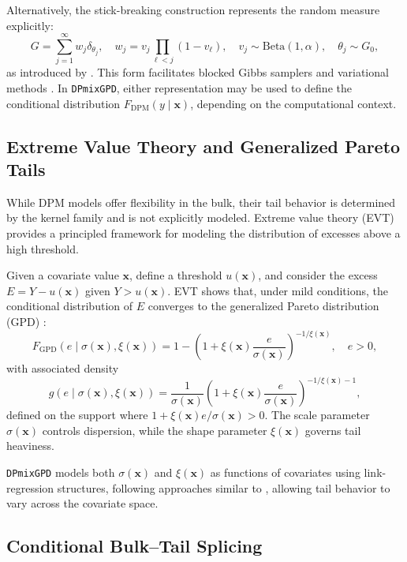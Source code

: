 \documentclass[article]{jss}\usepackage[]{graphicx}\usepackage[]{xcolor}
\begin{document}
Alternatively, the stick-breaking construction represents the random measure explicitly:
\[
G = \sum_{j=1}^\infty w_j \delta_{\theta_j}, \quad
w_j = v_j \prod_{\ell < j} (1 - v_\ell), \quad
v_j \sim \text{Beta}(1, \alpha), \quad
\theta_j \sim G_0,
\]
as introduced by \citet{sethuraman1994constructive}. This form facilitates blocked Gibbs samplers and variational methods \citep{ishwaran2001gibbs}. In \texttt{DPmixGPD}, either representation may be used to define the conditional distribution $F_{\text{DPM}}(y \mid \mathbf{x})$, depending on the computational context.

\subsection{Extreme Value Theory and Generalized Pareto Tails}

While DPM models offer flexibility in the bulk, their tail behavior is determined by the kernel family and is not explicitly modeled. Extreme value theory (EVT) provides a principled framework for modeling the distribution of excesses above a high threshold.

Given a covariate value $\mathbf{x}$, define a threshold $u(\mathbf{x})$, and consider the excess $E = Y - u(\mathbf{x})$ given $Y > u(\mathbf{x})$. EVT shows that, under mild conditions, the conditional distribution of $E$ converges to the generalized Pareto distribution (GPD) \citep{pickands1975statistical,embrechts1997modelling}:
\[
F_{\text{GPD}}(e \mid \sigma(\mathbf{x}), \xi(\mathbf{x})) = 1 - \left(1 + \xi(\mathbf{x}) \frac{e}{\sigma(\mathbf{x})}\right)^{-1/\xi(\mathbf{x})}, \quad e > 0,
\]
with associated density
\[
g(e \mid \sigma(\mathbf{x}), \xi(\mathbf{x})) =
\frac{1}{\sigma(\mathbf{x})}
\left(1 + \xi(\mathbf{x}) \frac{e}{\sigma(\mathbf{x})}\right)^{-1/\xi(\mathbf{x}) - 1},
\]
defined on the support where $1 + \xi(\mathbf{x}) e / \sigma(\mathbf{x}) > 0$. The scale parameter $\sigma(\mathbf{x})$ controls dispersion, while the shape parameter $\xi(\mathbf{x})$ governs tail heaviness.

\texttt{DPmixGPD} models both $\sigma(\mathbf{x})$ and $\xi(\mathbf{x})$ as functions of covariates using link-regression structures, following approaches similar to \citet{coles2001introduction}, allowing tail behavior to vary across the covariate space.

\subsection{Conditional Bulk–Tail Splicing}
\end{document}
